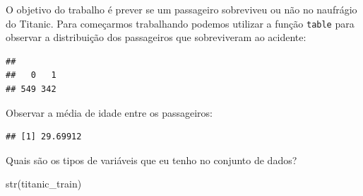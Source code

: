 \documentclass[
]{book}
\newenvironment{Shaded}{\begin{snugshade}}{\end{snugshade}}
\newcommand{\AttributeTok}[1]{\textcolor[rgb]{0.77,0.63,0.00}{#1}}
\newcommand{\ConstantTok}[1]{\textcolor[rgb]{0.00,0.00,0.00}{#1}}
\newcommand{\FunctionTok}[1]{\textcolor[rgb]{0.00,0.00,0.00}{#1}}
\newcommand{\NormalTok}[1]{#1}
\newcommand{\SpecialCharTok}[1]{\textcolor[rgb]{0.00,0.00,0.00}{#1}}
\begin{document}
O objetivo do trabalho é prever se um passageiro sobreviveu ou não no naufrágio do Titanic. Para começarmos trabalhando podemos utilizar a função \texttt{table} para observar a distribuição dos passageiros que sobreviveram ao acidente:

\begin{Shaded}
\end{Shaded}

\begin{verbatim}
## 
##   0   1 
## 549 342
\end{verbatim}

Observar a média de idade entre os passageiros:

\begin{Shaded}
\end{Shaded}

\begin{verbatim}
## [1] 29.69912
\end{verbatim}

Quais são os tipos de variáveis que eu tenho no conjunto de dados?

\begin{Shaded}
\begin{Highlighting}[]
\FunctionTok{str}\NormalTok{(titanic\_train)}
\end{Highlighting}
\end{Shaded}
\end{document}
